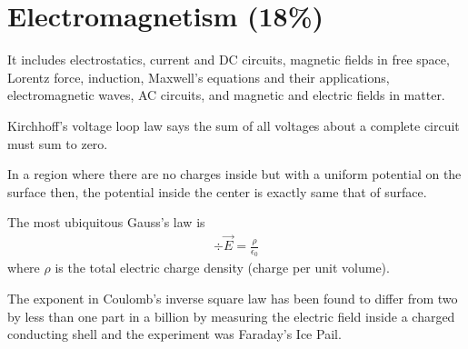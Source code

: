 
\section{Electromagnetism (18\%)}

It includes electrostatics, current and DC circuits, magnetic fields in free space, Lorentz force, induction, Maxwell's equations and their applications, electromagnetic waves, AC circuits, and magnetic and electric fields in matter.


Kirchhoff's voltage loop law says the sum of all voltages about a complete circuit must sum to zero.

In a region where there are no charges inside but with a uniform potential on the surface then, the potential inside the center is exactly same that of surface.

The most ubiquitous Gauss's law is
\begin{align*}
\div\vec{E} = \frac{\rho}{\epsilon_{0}} 
\end{align*}
 where $\rho$ is the total electric charge density (charge per unit volume).
 
The exponent in Coulomb's inverse square law has been found to differ from two by less than one part in a billion by measuring the electric field inside a charged conducting shell and the experiment was Faraday's Ice Pail.